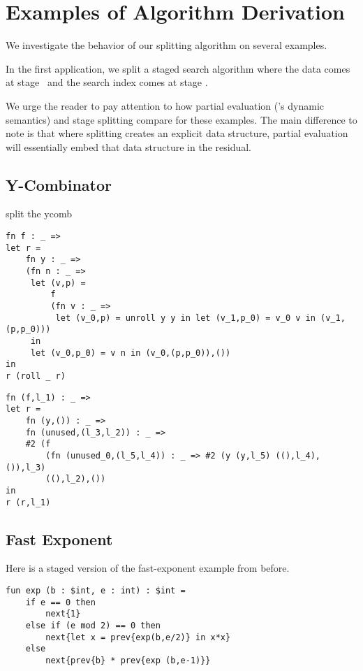 

\section{Examples of Algorithm Derivation}
\label{sec:examples}

We investigate the behavior of our splitting algorithm on several examples.

In the first application, we split a staged search algorithm where the data comes at stage \bbone\ and the search index comes at stage \bbtwo.  
 
We urge the reader to pay attention to how partial evaluation (\lang's dynamic semantics) and stage splitting compare for these examples.
The main difference to note is that where splitting creates an explicit data structure, partial evaluation will
essentially embed that data structure in the residual. 

\subsection {Y-Combinator}

split the ycomb

\begin{lstlisting} 
fn f : _ =>
let r =
    fn y : _ =>
    (fn n : _ =>
     let (v,p) =
         f
         (fn v : _ =>
          let (v_0,p) = unroll y y in let (v_1,p_0) = v_0 v in (v_1,(p,p_0)))
     in
     let (v_0,p_0) = v n in (v_0,(p,p_0)),())
in
r (roll _ r)
\end{lstlisting}


\begin{lstlisting} 
fn (f,l_1) : _ =>
let r =
    fn (y,()) : _ =>
    fn (unused,(l_3,l_2)) : _ =>
    #2 (f
        (fn (unused_0,(l_5,l_4)) : _ => #2 (y (y,l_5) ((),l_4),()),l_3)
        ((),l_2),())
in
r (r,l_1)
\end{lstlisting}


\subsection{Fast Exponent}

Here is a staged version of the fast-exponent example from before.
\begin{lstlisting} 
fun exp (b : $int, e : int) : $int =
	if e == 0 then
		next{1}
	else if (e mod 2) == 0 then
		next{let x = prev{exp(b,e/2)} in x*x}
	else
		next{prev{b} * prev{exp (b,e-1)}}
\end{lstlisting}

